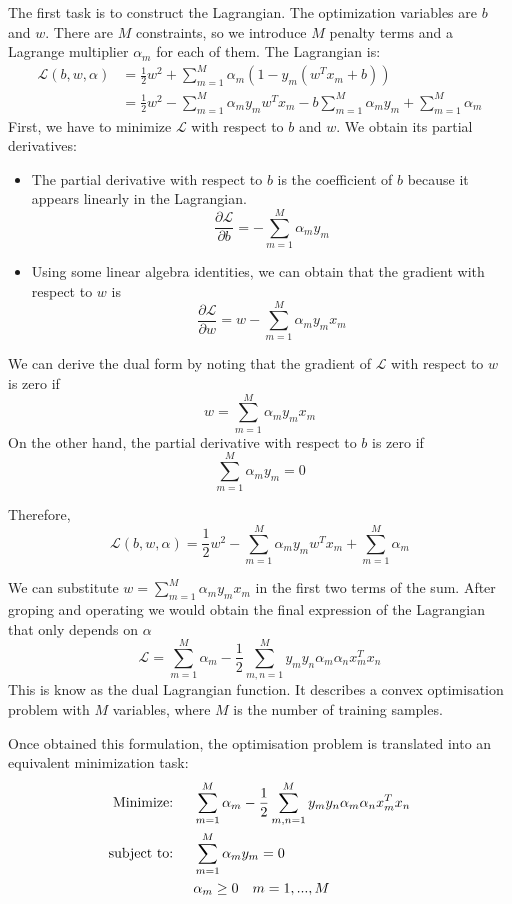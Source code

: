 The first task is to construct the Lagrangian. The optimization variables are $b$ and $w$. There are $M$ constraints, so we introduce $M$ penalty terms and a Lagrange multiplier $\alpha_m$ for each of them. The Lagrangian is:
\begin{align}
    \mathcal{L}(b,w,\alpha) &= \frac{1}{2}w^2 +\sum_{m=1}^M \alpha_m(1- y_m(w^T x_m +b)) \\
    &= \frac{1}{2}w^2 - \sum_{m=1}^M \alpha_m y_m w^T x_m - b \sum_{m=1}^M \alpha_m y_m + \sum_{m=1}^M \alpha_m
\end{align}
First, we have to minimize $\mathcal{L}$ with respect to $b$ and $w$. We obtain its partial derivatives:
\begin{itemize}
    \item The partial derivative with respect to $b$ is the coefficient of $b$ because it appears linearly in the Lagrangian. $$\frac{\partial \mathcal{L}}{\partial b} = -\sum_{m=1}^M \alpha_m y_m$$
    \item Using some linear algebra identities, we can obtain that the gradient with respect to $w$ is 
    $$\frac{\partial \mathcal{L}}{\partial w} = w - \sum_{m=1}^M \alpha_m y_m x_m$$
\end{itemize}

We can derive the dual form by noting that the gradient of $\mathcal{L}$ with respect to $w$ is zero if 
$$w = \sum_{m=1}^M \alpha_m y_m x_m$$
On the other hand, the partial derivative with respect to $b$ is zero if $$\sum_{m=1}^M \alpha_m y_m = 0$$

Therefore, 
$$\mathcal{L}(b,w,\alpha) = \frac{1}{2}w^2 - \sum_{m=1}^M \alpha_m y_m w^T x_m  + \sum_{m=1}^M \alpha_m$$

We can substitute $w = \sum_{m=1}^M \alpha_m y_m x_m $ in the first two terms of the sum. After groping and operating we would obtain the final expression of the Lagrangian that only depends on $\alpha$
\begin{equation}
    \mathcal{L} = \sum_{m=1}^M \alpha_m - \frac{1}{2} \sum_{m,n = 1}^M y_m y_n \alpha_m \alpha_n x_m^T x_n
\end{equation}
This is know as the dual Lagrangian function. It describes a convex optimisation problem with $M$ variables, where $M$ is the number of training samples.

Once obtained this formulation, the optimisation problem is translated into an equivalent minimization task:
\begin{align}
    \text{Minimize: \quad } &\sum_{m=1}^M \alpha_m - \frac{1}{2} \sum_{m,n = 1}^M y_m y_n \alpha_m \alpha_n x_m^T x_n \\
    \text{subject to: \quad } &\sum_{m=1}^M \alpha_m y_m = 0 \\
    &\alpha_m \geq 0 \quad m=1,...,M
\end{align}

